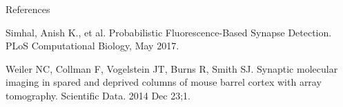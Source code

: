 \documentclass[final, table]{beamer}
\newlength{\onecolwid}
\begin{document}
\begin{frame}[t]
\begin{columns}[t]
\begin{column}{\onecolwid}
\begin{block}{References}
{\begin{thebibliography}{99}
Simhal, Anish K., et al. Probabilistic Fluorescence-Based Synapse Detection. PLoS Computational Biology, May 2017.

Weiler NC, Collman F, Vogelstein JT, Burns R, Smith SJ. Synaptic molecular imaging in spared and deprived columns of mouse barrel cortex with array tomography. Scientific Data. 2014 Dec 23;1.

\end{thebibliography}}
\end{block}

\end{column}


\end{columns}
\end{frame}
\end{document}
